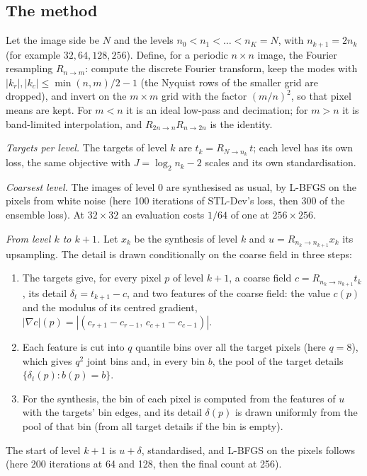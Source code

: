 \subsection{The method}

Let the image side be $N$ and the levels $n_0 < n_1 < \dots < n_K = N$, with $n_{k+1} = 2n_k$ (for example $32, 64, 128, 256$). Define, for a periodic $n\times n$ image, the Fourier resampling $R_{n\to m}$: compute the discrete Fourier transform, keep the modes with $|k_r|, |k_c| \le \min(n,m)/2 - 1$ (the Nyquist rows of the smaller grid are dropped), and invert on the $m\times m$ grid with the factor $(m/n)^2$, so that pixel means are kept. For $m<n$ it is an ideal low-pass and decimation; for $m>n$ it is band-limited interpolation, and $R_{2n\to n}R_{n\to 2n}$ is the identity.

\emph{Targets per level.} The targets of level $k$ are $t_k = R_{N\to n_k}\,t$; each level has its own loss, the same objective with $J=\log_2 n_k - 2$ scales and its own standardisation.

\emph{Coarsest level.} The images of level 0 are synthesised as usual, by L-BFGS on the pixels from white noise (here 100 iterations of STL-Dev's loss, then 300 of the ensemble loss). At $32\times32$ an evaluation costs $1/64$ of one at $256\times256$.

\emph{From level $k$ to $k+1$.} Let $x_k$ be the synthesis of level $k$ and $u = R_{n_k\to n_{k+1}}x_k$ its upsampling. The detail is drawn conditionally on the coarse field in three steps:
\begin{enumerate}
\item The targets give, for every pixel $p$ of level $k+1$, a coarse field $c = R_{n_k\to n_{k+1}}t_k$, its detail $\delta_t = t_{k+1} - c$, and two features of the coarse field: the value $c(p)$ and the modulus of its centred gradient, $|\nabla c|(p) = |(c_{r+1}-c_{r-1},\,c_{c+1}-c_{c-1})|$.
\item Each feature is cut into $q$ quantile bins over all the target pixels (here $q=8$), which gives $q^2$ joint bins and, in every bin $b$, the pool of the target details $\{\delta_t(p) : b(p) = b\}$.
\item For the synthesis, the bin of each pixel is computed from the features of $u$ with the targets' bin edges, and its detail $\delta(p)$ is drawn uniformly from the pool of that bin (from all target details if the bin is empty).
\end{enumerate}
The start of level $k+1$ is $u + \delta$, standardised, and L-BFGS on the pixels follows (here 200 iterations at 64 and 128, then the final count at 256).

